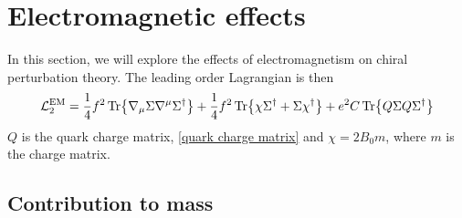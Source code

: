 \section{Electromagnetic effects}

In this section, we will explore the effects of electromagnetism on chiral perturbation theory.
The leading order Lagrangian is then~\autocite{eckerRoleResonancesChiral1989,urechVirtualPhotonsChiral1995}
%
\begin{equation}
    \label{leading order lagrangian EM}
    \mathcal{L}_2^{\text{EM}}
    = 
    \frac{1}{4}f^2 
    \Tr{
        \nabla_\mu \Sigma \nabla^\mu \Sigma^\dagger
    }
    +
    \frac{1}{4}f^2 
    \Tr{
        \chi \Sigma^\dagger + \Sigma\chi^\dagger
    }
    +
    e^2 C
    \Tr{Q \Sigma Q \Sigma^\dagger}
\end{equation}
%
$Q$ is the quark charge matrix, \autoref{quark charge matrix} and $\chi = 2B_0 m$, where $m$ is the charge matrix.



\subsection{Contribution to mass}


